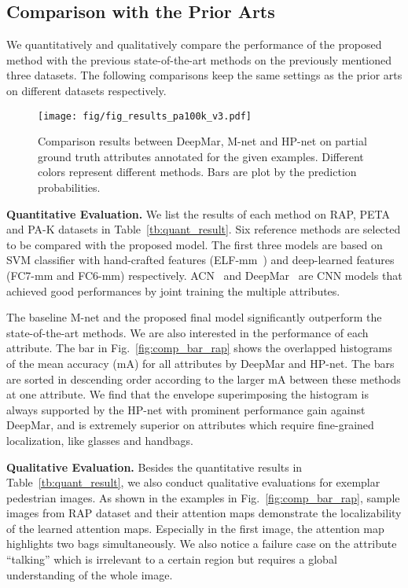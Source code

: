 \documentclass[10pt,twocolumn,letterpaper]{article}
\begin{document}
\subsection{Comparison with the Prior Arts}
\label{subsec:attribute_comp_results}

We quantitatively and qualitatively compare the performance of the proposed method with the previous state-of-the-art methods on the previously mentioned three datasets.
The following comparisons keep the same settings as the prior arts on different datasets respectively.





\begin{figure}[t]
\centering
\texttt{[image: fig/fig\_results\_pa100k\_v3.pdf]}
\caption{
Comparison results between DeepMar, M-net and HP-net on partial ground truth attributes annotated for the given examples. Different colors represent different methods. Bars are plot by the prediction probabilities.
}
\label{fig:result_pa100k}
\vspace{-0.2cm}
\end{figure}



\noindent\textbf{Quantitative Evaluation.}
We list the results of each method on RAP, PETA and PA-K datasets in Table~\ref{tb:quant_result}.
Six reference methods are selected to be compared with the proposed model.
The first three models are based on SVM classifier with hand-crafted features (ELF-mm~\cite{gray2008viewpoint,prosser2010person}) and deep-learned features (FC7-mm and FC6-mm) respectively.
ACN~\cite{sudowe2015person} and DeepMar~\cite{li2015multi} are CNN models that achieved good performances by joint training the multiple attributes.

The baseline M-net and the proposed final model significantly outperform the state-of-the-art methods.
We are also interested in the performance of each attribute.
The bar in Fig.~\ref{fig:comp_bar_rap} shows the overlapped histograms of the mean accuracy (mA) for all attributes by DeepMar and HP-net.
The bars are sorted in descending order according to the larger mA between these methods at one attribute.
We find that the envelope superimposing the histogram is always supported by the HP-net with prominent performance gain against DeepMar, and is extremely superior on attributes which require fine-grained localization, like glasses and handbags.

\noindent\textbf{Qualitative Evaluation.}
Besides the quantitative results in Table~\ref{tb:quant_result}, we also conduct qualitative evaluations for exemplar pedestrian images.
As shown in the examples in Fig.~\ref{fig:comp_bar_rap}, sample images from RAP dataset and their attention maps demonstrate the localizability of the learned attention maps.
Especially in the first image, the attention map highlights two bags simultaneously.
We also notice a failure case on the attribute ``talking'' which is irrelevant to a certain region but requires a global understanding of the whole image.
\end{document}
